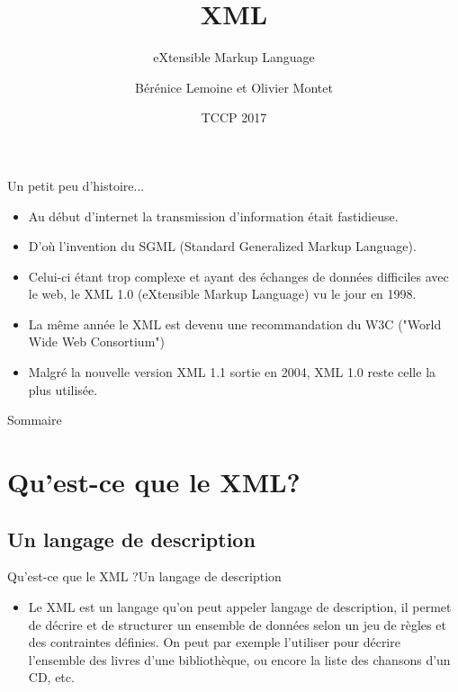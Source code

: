 \documentclass{beamer}
\title{XML}
\subtitle{ eXtensible Markup Language }
\author{Bérénice Lemoine et Olivier Montet}
\institute[] 
{
Faculté des Sciences\\
Université de Montpellier\\
Département Informatique
}
\date{TCCP 2017}
\begin{document}
\begin{frame}
  \titlepage
\end{frame}

\begin{frame}{Un petit peu d'histoire...}
  \begin{itemize}
    \item {
    Au début d'internet la transmission d'information était fastidieuse.
    }\pause
    \item{
    D'où l'invention du SGML (Standard Generalized Markup Language).
    }\pause
    \item{
    Celui-ci étant trop complexe et ayant des échanges de données difficiles avec le web, le XML 1.0 (eXtensible Markup Language) vu le jour en 1998.
    }\pause
    \item{
    La même année le XML est devenu une recommandation du W3C ("World Wide Web Consortium")
    }\pause
    \item{
    Malgré la nouvelle version XML 1.1 sortie en 2004, XML 1.0 reste celle la plus utilisée.
    }
  \end{itemize}
\end{frame}
    
\begin{frame}{Sommaire}
  \tableofcontents
\end{frame}

\section{Qu'est-ce que le XML?}

\subsection{Un langage de description}

\begin{frame}{Qu'est-ce que le XML ?}{Un langage de description}
  \begin{itemize}
  \item {
    Le XML est un langage qu’on peut appeler langage de description, il permet de décrire et de structurer un ensemble de données selon un jeu de règles et des contraintes définies. On peut par exemple l'utiliser pour décrire l'ensemble des livres d'une bibliothèque, ou encore la liste des chansons d'un CD, etc.
  }
  \end{itemize}
\end{frame}
\end{document}

